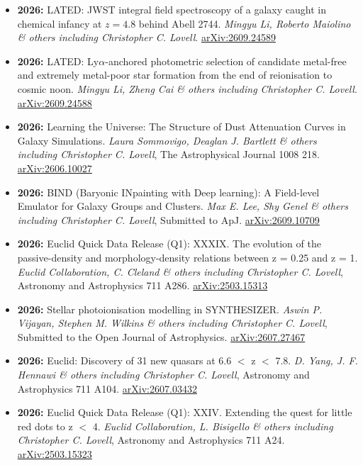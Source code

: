 \begin{itemize}
\item \textbf{2026:} LATED: JWST integral field spectroscopy of a galaxy caught in chemical infancy at $z=4.8$ behind Abell 2744. \textit{Mingyu Li, Roberto Maiolino \& others including Christopher C. Lovell}. \href{https://arxiv.org/abs/2609.24589}{arXiv:2609.24589}
\item \textbf{2026:} LATED: Ly$α$-anchored photometric selection of candidate metal-free and extremely metal-poor star formation from the end of reionisation to cosmic noon. \textit{Mingyu Li, Zheng Cai \& others including Christopher C. Lovell}. \href{https://arxiv.org/abs/2609.24588}{arXiv:2609.24588}
\item \textbf{2026:} Learning the Universe: The Structure of Dust Attenuation Curves in Galaxy Simulations. \textit{Laura Sommovigo, Deaglan J. Bartlett \& others including Christopher C. Lovell}, The Astrophysical Journal 1008 218. \href{https://arxiv.org/abs/2606.10027}{arXiv:2606.10027}
\item \textbf{2026:} BIND (Baryonic INpainting with Deep learning): A Field-level Emulator for Galaxy Groups and Clusters. \textit{Max E. Lee, Shy Genel \& others including Christopher C. Lovell}, Submitted to ApJ. \href{https://arxiv.org/abs/2609.10709}{arXiv:2609.10709}
\item \textbf{2026:} Euclid Quick Data Release (Q1): XXXIX. The evolution of the passive-density and morphology-density relations between z = 0.25 and z = 1. \textit{Euclid Collaboration, C. Cleland \& others including Christopher C. Lovell}, Astronomy and Astrophysics 711 A286. \href{https://arxiv.org/abs/2503.15313}{arXiv:2503.15313}
\item \textbf{2026:} Stellar photoionisation modelling in SYNTHESIZER. \textit{Aswin P. Vijayan, Stephen M. Wilkins \& others including Christopher C. Lovell}, Submitted to the Open Journal of Astrophysics. \href{https://arxiv.org/abs/2607.27467}{arXiv:2607.27467}
\item \textbf{2026:} Euclid: Discovery of 31 new quasars at 6.6 $<$ z $<$ 7.8. \textit{D. Yang, J. F. Hennawi \& others including Christopher C. Lovell}, Astronomy and Astrophysics 711 A104. \href{https://arxiv.org/abs/2607.03432}{arXiv:2607.03432}
\item \textbf{2026:} Euclid Quick Data Release (Q1): XXIV. Extending the quest for little red dots to z $<$ 4. \textit{Euclid Collaboration, L. Bisigello \& others including Christopher C. Lovell}, Astronomy and Astrophysics 711 A24. \href{https://arxiv.org/abs/2503.15323}{arXiv:2503.15323}

\end{itemize}
